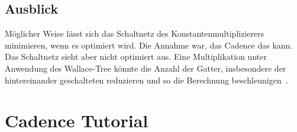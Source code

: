  
 \section{Ausblick}
 Möglicher Weise lässt sich das Schaltnetz des Konstantenmultiplizierers minimieren, wenn es optimiert wird. Die Annahme war, das Cadence das kann. Das Schaltnetz sieht aber nicht
 optimiert aus. Eine Multiplikation unter Anwendung des Wallace-Tree könnte die Anzahl der Gatter, insbesondere der hintereinander geschalteten reduzieren und so die Berechnung
 beschleunigen~\autocite[8-10]{jdrechsler2008binMultWerke}.
 
 
 \printglossary[title={Abkürzungsverzeichnis}] 
 
 \listoffigures

 \listoftables

 
 \printbibliography
 
 \appendix
 
 \chapter{Cadence Tutorial}
 
 
 

